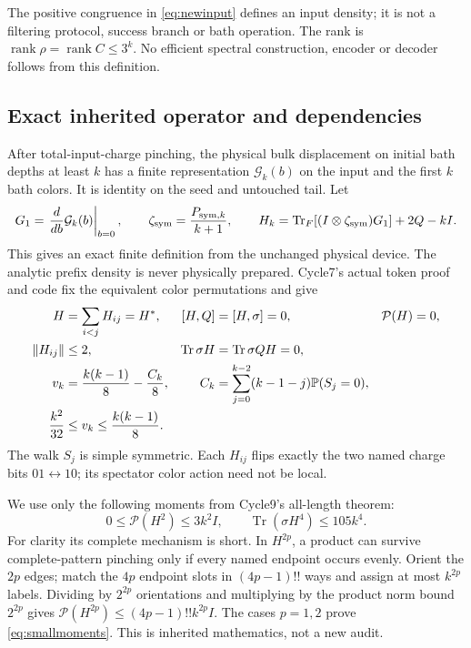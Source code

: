 \documentclass[11pt]{article}
\newcommand{\Tr}{\operatorname{Tr}}
\newcommand{\rank}{\operatorname{rank}}
\newcommand{\norm}[1]{\lVert #1\rVert}
\newcommand{\Prob}{\mathbb P}
\newcommand{\pin}{\mathcal P}
\begin{document}
The positive congruence in \eqref{eq:newinput} defines an input density;
it is not a filtering protocol, success branch or bath operation.
The rank is \(\rank\rho=\rank C\le3^k\). No efficient spectral
construction, encoder or decoder follows from this definition.

\subsection{Exact inherited operator and dependencies}

After total-input-charge pinching, the physical bulk displacement on
initial bath depths at least \(k\) has a finite representation
\(\mathcal G_k(b)\) on the input and the first \(k\) bath colors. It is
identity on the seed and untouched tail. Let
\[
 G_1=\left.\frac{d}{db}\mathcal G_k(b)\right|_{b=0},\qquad
 \zeta_{\rm sym}=\frac{P_{{\rm sym},k}}{k+1},\qquad
 H_k=\Tr_F[(I\otimes\zeta_{\rm sym})G_1]+2Q-kI.
\]
This gives an exact finite definition from the unchanged physical device.
The analytic prefix density is never physically prepared. Cycle7's actual
token proof and code fix the equivalent color permutations and give
\begin{align}
 H&=\sum_{i<j}H_{ij}=H^*,&[H,Q]&=[H,\sigma]=0,&\pin(H)&=0,\notag\\
 \norm{H_{ij}}&\le2,&\Tr\sigma H&=\Tr\sigma QH=0,\notag\\
 v_k&=\frac{k(k-1)}8-\frac{C_k}{8},&
 C_k&=\sum_{j=0}^{k-2}(k-1-j)\Prob(S_j=0),\label{eq:inheritedv}\\
 \frac{k^2}{32}&\le v_k\le\frac{k(k-1)}8.\notag
\end{align}
The walk \(S_j\) is simple symmetric. Each \(H_{ij}\) flips exactly
the two named charge bits \(01\leftrightarrow10\); its spectator color
action need not be local.

We use only the following moments from Cycle9's all-length theorem:
\begin{equation}\label{eq:smallmoments}
 0\le\pin(H^2)\le3k^2I,\qquad \Tr(\sigma H^4)\le105k^4.
\end{equation}
For clarity its complete mechanism is short. In \(H^{2p}\), a product
can survive complete-pattern pinching only if every named endpoint occurs
evenly. Orient the \(2p\) edges; match the \(4p\) endpoint slots in
\((4p-1)!!\) ways and assign at most \(k^{2p}\) labels. Dividing by
\(2^{2p}\) orientations and multiplying by the product norm bound
\(2^{2p}\) gives
\(\pin(H^{2p})\le(4p-1)!!k^{2p}I\). The cases \(p=1,2\) prove
\eqref{eq:smallmoments}. This is inherited mathematics, not a new audit.
\end{document}
